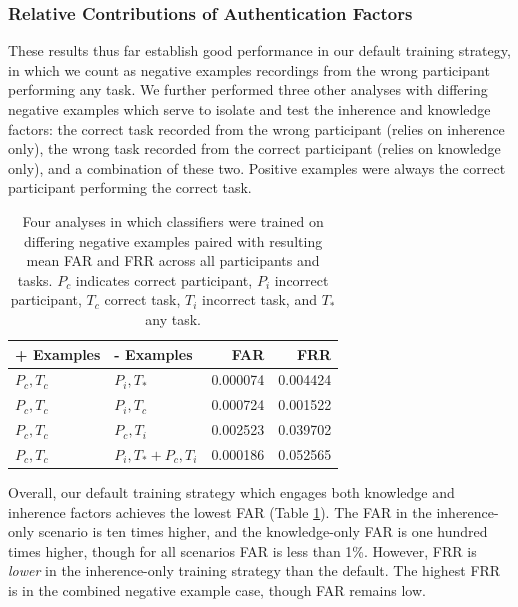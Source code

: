 \documentclass[a4paper,twoside]{article}
\begin{document}
\subsubsection{Relative Contributions of Authentication Factors}

\noindent These results thus far establish good performance in our default training strategy, in which we count as negative examples recordings from the wrong participant performing any task. We further performed three other analyses with differing negative examples which serve to isolate and test the inherence and knowledge factors: the correct task recorded from the wrong participant (relies on inherence only), the wrong task recorded from the correct participant (relies on knowledge only), and a combination of these two. Positive examples were always the correct participant performing the correct task.

\begin{table}[h]
\caption{Four analyses in which classifiers were trained on differing negative examples paired with resulting mean FAR and FRR across all participants and tasks. $P_c$ indicates correct participant, $P_i$ incorrect participant, $T_c$ correct task, $T_i$ incorrect task, and $T_*$ any task.}
\label{tab:compare}
\begin{center}
\begin{tabular}{llrr}
 \textbf{+ Examples} & \textbf{- Examples} & \textbf{FAR} & \textbf{FRR} \\
\hline
$P_c, T_c$ & $P_i, T_*$ & 0.000074 & 0.004424\\
$P_c, T_c$ & $P_i, T_c$ & 0.000724 & 0.001522\\
$P_c, T_c$ & $P_c, T_i$ & 0.002523 & 0.039702\\
$P_c, T_c$ & $P_i, T_* + P_c, T_i$ & 0.000186 & 0.052565\\
\hline
\end{tabular}
\end{center}
\end{table}

Overall, our default training strategy which engages both knowledge and inherence factors achieves the lowest FAR (Table \ref{tab:compare}). The FAR in the inherence-only scenario is ten times higher, and the knowledge-only FAR is one hundred times higher, though for all scenarios FAR is less than 1\%. However, FRR is \textit{lower} in the inherence-only training strategy than the default. The highest FRR is in the combined negative example case, though FAR remains low.
\end{document}
